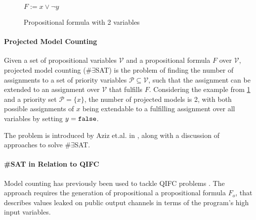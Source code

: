 \begin{figure}
    \centering
    $F := x \lor \lnot y$
    \caption{Propositional formula with 2 variables}
    \label{fig:satEx}
\end{figure}

\paragraph*{Projected Model Counting}
Given a set of propositional variables $\mathcal{V}$ and a propositional formula $F$ over $\mathcal{V}$, projected model counting (\#$\exists$SAT) is the problem of finding the number of assignments to a set of priority variables $\mathcal{P} \subseteq \mathcal{V}$, such that the assignment can be extended to an assignment over $\mathcal{V}$ that fulfills $F$. Considering the example from \ref{fig:satEx} and a priority set $\mathcal{P} = \{x\}$, the number of projected models is 2, with both possible assignments of $x$ being extendable to a fulfilling assignment over all variables by setting $y = \mathtt{false}$.

The problem is introduced by Aziz et.al. in \cite{aziz15}, along with a discussion of approaches to solve \#$\exists$SAT. 

\paragraph*{\#SAT in Relation to QIFC}
Model counting has previously been used to tackle QIFC problems \cite{klebanov13, enescu16, biondi18,chu19}. The approach requires the generation of propositional a propositional formula $F_o$, that describes values leaked on public output channels in terms of the program's high input variables.




